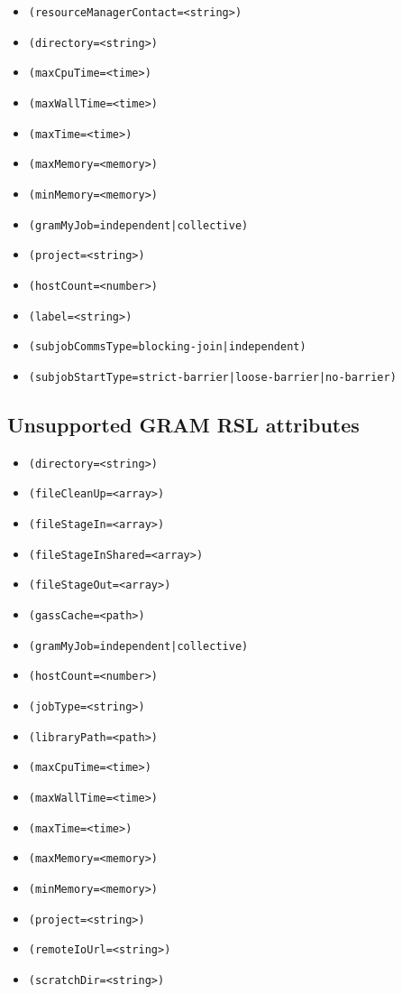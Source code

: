 \documentclass{book}
\begin{document}
  \begin{itemize}
    \item \verb#(resourceManagerContact=<string>)#
    \item \verb#(directory=<string>)#
    \item \verb#(maxCpuTime=<time>)#
    \item \verb#(maxWallTime=<time>)#
    \item \verb#(maxTime=<time>)#
    \item \verb#(maxMemory=<memory>)#
    \item \verb#(minMemory=<memory>)#
    \item \verb#(gramMyJob=independent|collective)#
    \item \verb#(project=<string>)#
    \item \verb#(hostCount=<number>)#
    \item \verb#(label=<string>)#
    \item \verb#(subjobCommsType=blocking-join|independent)#
    \item \verb#(subjobStartType=strict-barrier|loose-barrier|no-barrier)#
  \end{itemize}

  \subsection{Unsupported GRAM RSL attributes}

  \begin{itemize}
    \item \verb#(directory=<string>)#
    \item \verb#(fileCleanUp=<array>)#
    \item \verb#(fileStageIn=<array>)#
    \item \verb#(fileStageInShared=<array>)#
    \item \verb#(fileStageOut=<array>)#
    \item \verb#(gassCache=<path>)#
    \item \verb#(gramMyJob=independent|collective)#
    \item \verb#(hostCount=<number>)#
    \item \verb#(jobType=<string>)#
    \item \verb#(libraryPath=<path>)#
    \item \verb#(maxCpuTime=<time>)#
    \item \verb#(maxWallTime=<time>)#
    \item \verb#(maxTime=<time>)#
    \item \verb#(maxMemory=<memory>)#
    \item \verb#(minMemory=<memory>)#
    \item \verb#(project=<string>)#
    \item \verb#(remoteIoUrl=<string>)#
    \item \verb#(scratchDir=<string>)#
  \end{itemize}
\end{document}
